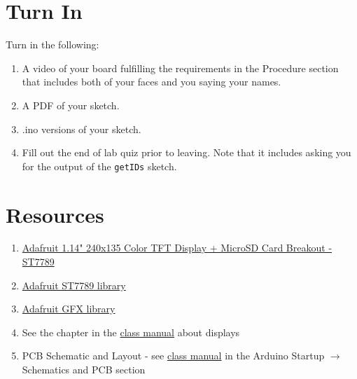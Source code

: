 \section{Turn In}
Turn in the following:
\begin{enumerate}
    \item A video of your board fulfilling the requirements in the Procedure section 
            that includes both of your faces and you saying your names.
    \item A PDF of your sketch.
    \item .ino versions of your sketch.
    \item Fill out the end of lab quiz prior to leaving. Note that it includes asking you 
            for the output of the \lstinline$getIDs$ sketch. 
\end{enumerate}

\section{Resources}\label{sec:displaysresources}
\begin{enumerate}
    \item \href{https://www.adafruit.com/product/4383}{Adafruit 1.14" 240x135 Color TFT Display + MicroSD Card Breakout - ST7789}
    \item \href{https://www.arduino.cc/reference/en/libraries/adafruit-st7735-and-st7789-library/}{Adafruit ST7789 library}
    \item \href{https://learn.adafruit.com/adafruit-gfx-graphics-library}{Adafruit GFX library}
    \item See the chapter in the \href{https://github.com/semcneil/Fundamentals-of-Microcontrollers-Manual}{class manual} about displays
    \item PCB Schematic and Layout - see 
            \href{https://github.com/semcneil/Fundamentals-of-Microcontrollers-Manual}{class manual} 
            in the Arduino Startup $\rightarrow$ Schematics and PCB section
\end{enumerate}

